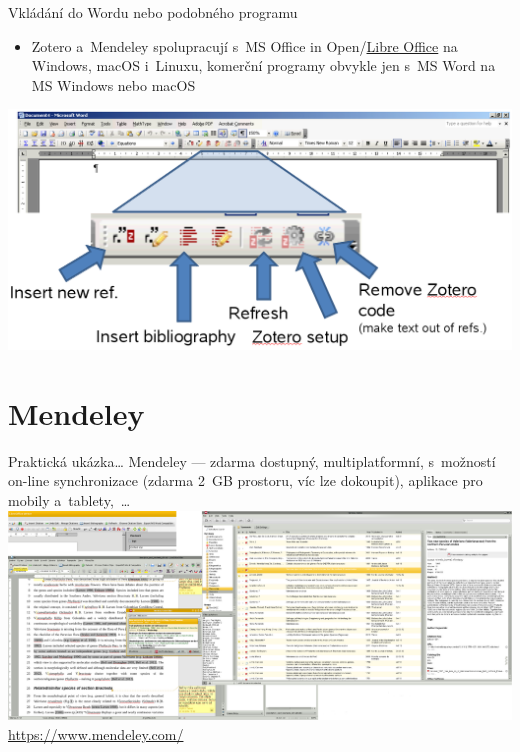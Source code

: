 \documentclass[compress, ucs, xelatex, xcolor=dvipsnames, print,
	hyperref={
		bookmarks=true,
		unicode=true,
		colorlinks=true,
		pdftitle={Citacni software},
		plainpages=false,
		pdfauthor={Vojtech Zeisek},
		pdfsubject={Kratky uvod do citacniho software},
		pdfcreator={XeLaTeX},
		pdfkeywords={citace, reference, software, literatura},
		linkcolor=Red,
		anchorcolor=Red,
		citecolor=Green,
		filecolor=Magenta,
		menucolor=Green,
		urlcolor=Cyan,
		pdftex},
	url={hyphens, lowtilde} %
	]{beamer}
\begin{document}
\begin{frame}{Vkládání do Wordu nebo podobného programu}
	\begin{itemize}
		\item Zotero a~Mendeley spolupracují s~MS Office in Open/\href{https://cs.libreoffice.org/}{Libre Office} na Windows, macOS i~Linuxu, komerční programy obvykle jen s~MS Word na MS Windows nebo macOS
	\end{itemize}
	\includegraphics[width=\textwidth]{zotero_lista.png}
\end{frame}

\section{Mendeley}

\begin{frame}{Praktická ukázka\ldots}
	Mendeley --- zdarma dostupný, multiplatformní, s~možností on-line synchronizace (zdarma 2~GB prostoru, víc lze dokoupit), aplikace pro mobily a~tablety,~\ldots\\
	\includegraphics[width=\textwidth]{mendeley.png}
	\flushright\url{https://www.mendeley.com/}
\end{frame}
\end{document}
